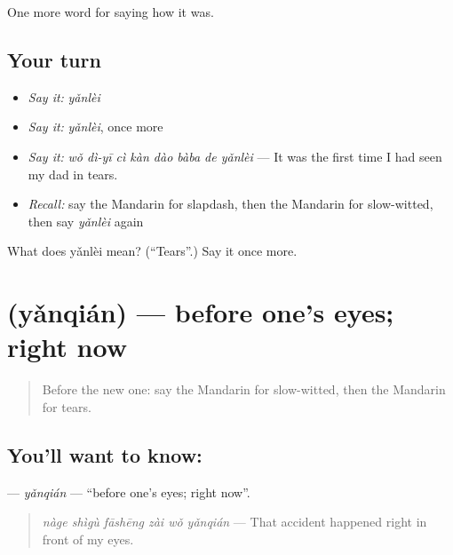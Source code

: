 \begin{grammarlens}[title={What you've built}]
One more word for saying how it was.
\end{grammarlens}

\subsection*{Your turn}
\begin{itemize}
\raggedright
  \item \emph{Say it:} \emph{yǎnlèi}
  \item \emph{Say it:} \emph{yǎnlèi}, once more
  \item \emph{Say it:} \emph{wǒ dì-yī cì kàn dào bàba de yǎnlèi} — It was the first time I had seen my dad in tears.
  \item \emph{Recall:} say the Mandarin for slapdash, then the Mandarin for slow-witted, then say \emph{yǎnlèi} again
\end{itemize}

\begin{tcolorbox}[breakable,colback=teal!4,colframe=teal!35!black,title={Before you move on}]
What does yǎnlèi mean? (\textquotedblleft{}Tears\textquotedblright{}.) Say it once more.
\end{tcolorbox}
\section[\texorpdfstring{\zh{眼前} (yǎnqián)}{眼前 (yǎnqián)}]{ (yǎnqián) — before one's eyes; right now}

\label{lesson:ZH-C471-yanqian}



\begin{quote}
Before the new one: say the Mandarin for slow-witted, then the Mandarin for tears.
\end{quote}

\subsection*{You'll want to know: }
\textbf{} — \emph{yǎnqián} — \textquotedblleft{}before one's eyes; right now\textquotedblright{}.

\begin{quote}
\textbf{} \emph{nàge shìgù fāshēng zài wǒ yǎnqián} — That accident happened right in front of my eyes.
\end{quote}

